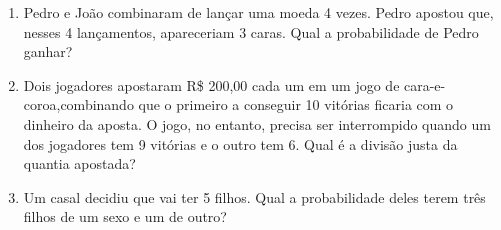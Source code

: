 \documentclass[oneside,a4paper,12pt]{article}
\begin{document}
\begin{enumerate}
\item Pedro e João combinaram de lançar uma moeda 4 vezes. Pedro apostou que, nesses 4 lançamentos, apareceriam 3 caras. Qual a probabilidade de Pedro ganhar?

\item Dois jogadores apostaram R\$ 200,00 cada um em um jogo de cara-e-coroa,combinando que o primeiro a conseguir 10 vitórias ficaria com o dinheiro da aposta. O jogo, no entanto, precisa ser interrompido quando um dos jogadores tem 9 vitórias e o outro tem 6. Qual é a divisão justa da quantia apostada?

\item Um casal decidiu que vai ter 5 filhos. Qual a probabilidade deles terem três filhos de um sexo e um de outro?

\end{enumerate}
\end{document}
